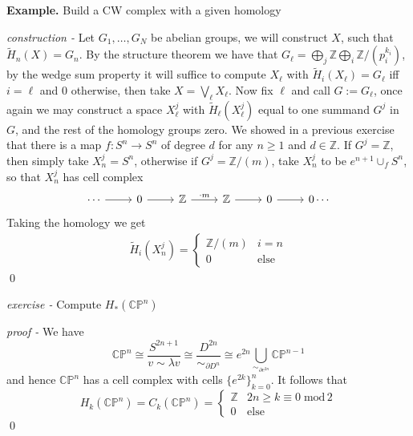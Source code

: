 \documentclass[11pt]{article}
\theoremstyle{definition}
\newcommand{\set}[1]{\{#1\}}
\begin{document}

    \textbf{Example.} Build a CW complex with a given homology

    \emph{construction - } Let \(G_1, \hdots, G_N\) be abelian groups, we will construct \(X\), such that \(\tilde{H}_n(X) = G_n\). By the structure theorem we have that \(G_\ell = \bigoplus_j \mathbb{Z} \bigoplus_i \mathbb{Z}/(p_i^{k_i})\), by the wedge sum property it will suffice to compute \(X_\ell\) with \(\tilde{H}_i(X_\ell) = G_\ell\) iff \(i = \ell\) and \(0\) otherwise, then take \(X = \bigvee_\ell X_\ell\). Now fix \(\ell\) and call \(G := G_\ell\), once again we may construct a space \(X_\ell^j\) with \(\tilde{H}_\ell(X_\ell^j)\) equal to one summand \(G^j\) in \(G\), and the rest of the homology groups zero. We showed in a previous exercise that there is a map \(f: S^n \to S^n\) of degree \(d\) for any \(n \geq 1\) and \(d \in \mathbb{Z}\). If \(G^j = \mathbb{Z}\), then simply take \(X_n^j = S^n\), otherwise if \(G^j = \mathbb{Z}/(m)\), take \(X_n^j\) to be \(e^{n+1} \cup_f S^n\), so that \(X_n^j\) has cell complex
    \begin{equation*}
        \begin{tikzcd}
            \cdots \arrow[r,"{}"] & 0 \arrow[r,"{}"] & \mathbb{Z} \arrow[r,"{\cdot m}"] & \mathbb{Z} \arrow[r,"{}"] & 0 \arrow[r,"{}"] & 0\cdots
        \end{tikzcd}
    \end{equation*}
    Taking the homology we get
    \begin{align*}
        \tilde{H}_i(X_n^j) = \begin{cases}
            \mathbb{Z}/(m) & i = n \\
            0 & \text{else}
        \end{cases}
    \end{align*}
    \qed


    \emph{exercise - } Compute \(H_*(\mathbb{CP}^n)\)

    \emph{proof - } We have \[\mathbb{CP}^n \cong \frac{S^{2n+1}}{v \sim \lambda v} \cong \frac{D^{2n}}{\sim_{\partial D^n}} \cong e^{2n}\bigcup_{\sim_{\partial e^{2n}}}\mathbb{CP}^{n-1}\]
    and hence \(\mathbb{CP}^n \) has a cell complex with cells \(\set{e^{2k}}_{k=0}^n\). It follows that \[H_k(\mathbb{CP}^n) = C_k(\mathbb{CP}^n) = \begin{cases}
        \mathbb{Z} & 2n \geq k \equiv 0 \;\text{mod}\,2 \\
        0 &\text{else}
    \end{cases}\]
    \qed
\end{document}
